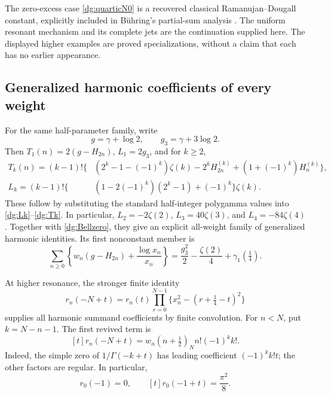 \documentclass[11pt,a4paper]{article}
\numberwithin{equation}{section}
\theoremstyle{definition}
\theoremstyle{remark}
\begin{document}
The zero-excess case \eqref{dg:quarticN0} is a recovered classical
Ramanujan--Dougall constant, explicitly included in B\"uhring's
partial-sum analysis \cite[Section 4, Corollaries 1--2]{buhring}.
The uniform resonant mechanism and its complete jets are the
continuation supplied here. The displayed higher examples are proved
specializations, without a claim that each has no earlier appearance.

\subsection{Generalized harmonic coefficients of every weight}
For the same half-parameter family, write
\[
 g=\gamma+\log2,\qquad g_3=\gamma+3\log2.
\]
Then $T_1(n)=2(g-H_{2n})$, $L_1=2g_3$, and for $k\ge2$,
\begin{align}
 T_k(n)=(k-1)!\big\{&
 (2^k-1-(-1)^k)\zeta(k)-2^kH_{2n}^{(k)}
                  +(1+(-1)^k)H_n^{(k)}\big\},
                    \label{dg:harmonicTk}\\
 L_k=(k-1)!\big\{&(1-2(-1)^k)(2^k-1)+(-1)^k\big\}\zeta(k).
                    \label{dg:harmonicLk}
\end{align}
These follow by substituting the standard half-integer polygamma
values into \eqref{dg:Lk}--\eqref{dg:Tk}. In particular,
$L_2=-2\zeta(2)$, $L_3=40\zeta(3)$, and $L_4=-84\zeta(4)$.
Together with \eqref{dg:Bellzero}, they give an explicit all-weight
family of generalized harmonic identities. Its first nonconstant
member is
\begin{equation}\label{dg:quarticharmonic1}
 \boxed{\sum_{n\ge0}\left\{w_n(g-H_{2n})
                         +\frac{\log x_n}{x_n}\right\}
       =\frac{g_3^2}{2}-\frac{\zeta(2)}4+\gamma_1(\tfrac14).}
\end{equation}

At higher resonance, the stronger finite identity
\begin{equation}\label{dg:quarticshift}
 r_n(-N+t)=r_n(t)\prod_{r=0}^{N-1}
                   \{x_n^2-(r+\tfrac14-t)^2\}
\end{equation}
supplies all harmonic summand coefficients by finite convolution.
For $n<N$, put $k=N-n-1$. The first revived term is
\begin{equation}\label{dg:quarticrevival}
 [t]r_n(-N+t)=w_n(n+\tfrac12)_N n!(-1)^k k!.
\end{equation}
Indeed, the simple zero of $1/\Gamma(-k+t)$ has leading coefficient
$(-1)^kk!t$; the other factors are regular. In particular,
\begin{equation}\label{dg:revivalpi}
 r_0(-1)=0,\qquad [t]r_0(-1+t)=\frac{\pi^2}{8}.
\end{equation}
\end{document}

